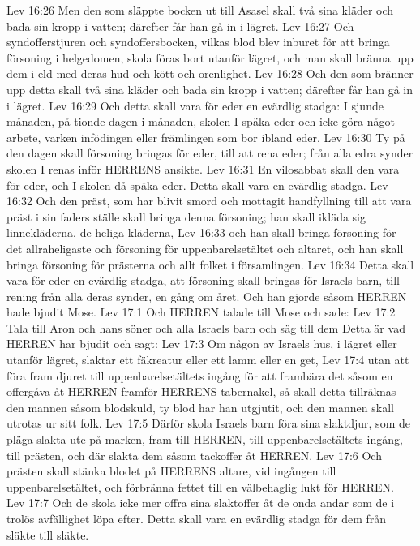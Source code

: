 Lev 16:26  Men den som släppte bocken ut till Asasel skall två sina kläder och bada sin kropp i vatten; därefter får han gå in i lägret.
Lev 16:27  Och syndofferstjuren och syndoffersbocken, vilkas blod blev inburet för att bringa försoning i helgedomen, skola föras bort utanför lägret, och man skall bränna upp dem i eld med deras hud och kött och orenlighet.
Lev 16:28  Och den som bränner upp detta skall två sina kläder och bada sin kropp i vatten; därefter får han gå in i lägret.
Lev 16:29  Och detta skall vara för eder en evärdlig stadga: I sjunde månaden, på tionde dagen i månaden, skolen I späka eder och icke göra något arbete, varken infödingen eller främlingen som bor ibland eder.
Lev 16:30  Ty på den dagen skall försoning bringas för eder, till att rena eder; från alla edra synder skolen I renas inför HERRENS ansikte.
Lev 16:31  En vilosabbat skall den vara för eder, och I skolen då späka eder. Detta skall vara en evärdlig stadga.
Lev 16:32  Och den präst, som har blivit smord och mottagit handfyllning till att vara präst i sin faders ställe skall bringa denna försoning; han skall ikläda sig linnekläderna, de heliga kläderna,
Lev 16:33  och han skall bringa försoning för det allraheligaste och försoning för uppenbarelsetältet och altaret, och han skall bringa försoning för prästerna och allt folket i församlingen.
Lev 16:34  Detta skall vara för eder en evärdlig stadga, att försoning skall bringas för Israels barn, till rening från alla deras synder, en gång om året. Och han gjorde såsom HERREN hade bjudit Mose.
Lev 17:1  Och HERREN talade till Mose och sade:
Lev 17:2  Tala till Aron och hans söner och alla Israels barn och säg till dem Detta är vad HERREN har bjudit och sagt:
Lev 17:3  Om någon av Israels hus, i lägret eller utanför lägret, slaktar ett fäkreatur eller ett lamm eller en get,
Lev 17:4  utan att föra fram djuret till uppenbarelsetältets ingång för att frambära det såsom en offergåva åt HERREN framför HERRENS tabernakel, så skall detta tillräknas den mannen såsom blodskuld, ty blod har han utgjutit, och den mannen skall utrotas ur sitt folk.
Lev 17:5  Därför skola Israels barn föra sina slaktdjur, som de pläga slakta ute på marken, fram till HERREN, till uppenbarelsetältets ingång, till prästen, och där slakta dem såsom tackoffer åt HERREN.
Lev 17:6  Och prästen skall stänka blodet på HERRENS altare, vid ingången till uppenbarelsetältet, och förbränna fettet till en välbehaglig lukt för HERREN.
Lev 17:7  Och de skola icke mer offra sina slaktoffer åt de onda andar som de i trolös avfällighet löpa efter. Detta skall vara en evärdlig stadga för dem från släkte till släkte.

